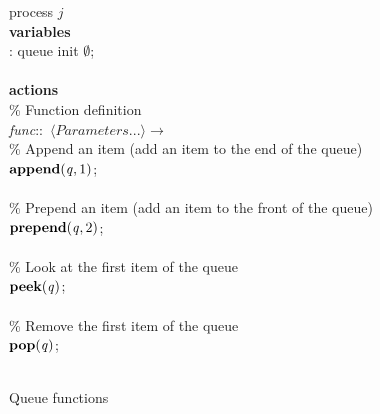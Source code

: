 \begin{figure}[H]
  \centering
  \begin{boxedminipage}{\linewidth}
    \null process $j$\\
    \null \textbf{variables}\\
    \null\qq {}: queue init $\emptyset$;\\~\\
    \null \textbf{actions}\\
    \null\qq \% Function definition\\
    \null\qq \emph{func}::~$\langle Parameters...\rangle \rightarrow$\\
    \null\qq\qq \% Append an item (add an item to the end of the queue)\\
    \null\qq\qq $\mbox{\textbf{append}}(\mbox{\emph{q}}, 1)$;\\~\\
    \null\qq\qq \% Prepend an item (add an item to the front of the queue)\\
    \null\qq\qq $\mbox{\textbf{prepend}}(\mbox{\emph{q}}, 2)$;\\~\\
    \null\qq\qq \% Look at the first item of the queue\\
    \null\qq\qq $\mbox{\textbf{peek}}(\mbox{\emph{q}})$;\\~\\
    \null\qq\qq \% Remove the first item of the queue\\
    \null\qq\qq $\mbox{\textbf{pop}}(\mbox{\emph{q}})$;\\~\\
  \end{boxedminipage}
  \caption{Queue functions}
\end{figure}

